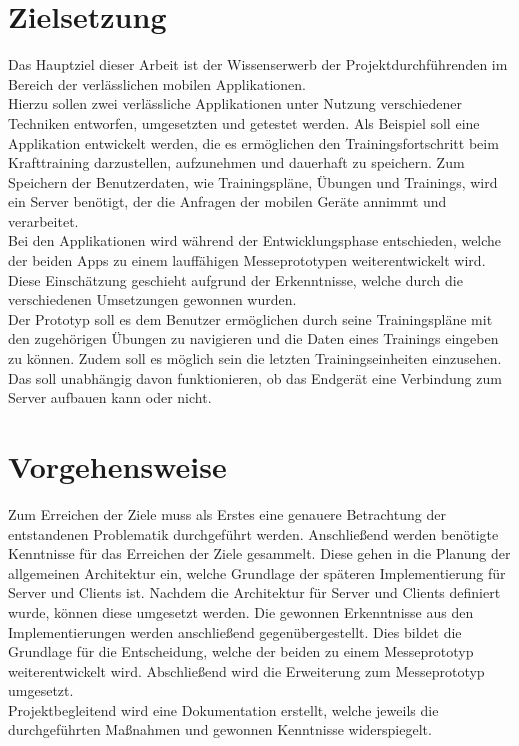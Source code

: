 \section{Zielsetzung}
\label{sec:zielsetzung}
Das Hauptziel dieser Arbeit ist der Wissenserwerb der Projektdurchführenden im Bereich der verlässlichen mobilen Applikationen. \\
Hierzu sollen zwei verlässliche Applikationen unter Nutzung verschiedener Techniken entworfen, umgesetzten und getestet werden. Als Beispiel soll eine Applikation entwickelt werden, die es ermöglichen den Trainingsfortschritt beim Krafttraining darzustellen, aufzunehmen und dauerhaft zu speichern. Zum Speichern der Benutzerdaten, wie Trainingspläne, Übungen und Trainings, wird ein Server benötigt, der die Anfragen der mobilen Geräte annimmt und verarbeitet.\\
Bei den Applikationen wird während der Entwicklungsphase entschieden, welche der beiden Apps zu einem lauffähigen Messeprototypen weiterentwickelt wird. Diese Einschätzung geschieht aufgrund der Erkenntnisse, welche durch die verschiedenen Umsetzungen gewonnen wurden.\\
Der Prototyp soll es dem Benutzer ermöglichen durch seine Trainingspläne mit den zugehörigen Übungen zu navigieren und die Daten eines Trainings eingeben zu können. Zudem soll es möglich sein die letzten Trainingseinheiten einzusehen. Das soll unabhängig davon funktionieren, ob das Endgerät eine Verbindung zum Server aufbauen kann oder nicht.
\section{Vorgehensweise}
\label{sec:vorgehensweise}
Zum Erreichen der Ziele muss als Erstes eine genauere Betrachtung der entstandenen Problematik durchgeführt werden. Anschließend werden benötigte Kenntnisse für das Erreichen der Ziele gesammelt. Diese gehen in die Planung der allgemeinen Architektur ein, welche Grundlage der späteren Implementierung für Server und Clients ist. Nachdem die Architektur für Server und Clients definiert wurde, können diese umgesetzt werden. Die gewonnen Erkenntnisse aus den Implementierungen werden anschließend gegenübergestellt. Dies bildet die Grundlage für die Entscheidung, welche der beiden zu einem Messeprototyp weiterentwickelt wird. Abschließend wird die Erweiterung zum Messeprototyp umgesetzt.\\
Projektbegleitend wird eine Dokumentation erstellt, welche jeweils die durchgeführten Maßnahmen und gewonnen Kenntnisse widerspiegelt. 
